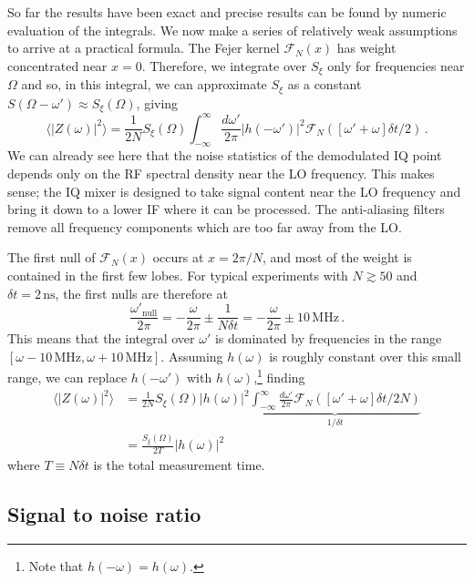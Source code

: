 So far the results have been exact and precise results can be found by numeric evaluation of the integrals.
We now make a series of relatively weak assumptions to arrive at a practical formula.
The Fejer kernel $\mathcal{F}_N(x)$ has weight concentrated near $x=0$.
Therefore, we integrate over $S_\xi$ only for frequencies near $\Omega$ and so, in this integral, we can approximate $S_\xi$ as a constant $S(\Omega - \omega') \approx S_\xi(\Omega)$, giving
\begin{equation}
\langle |Z(\omega)|^2 \rangle =
\frac{1}{2N} S_\xi(\Omega) \int_{-\infty}^\infty \frac{d\omega'}{2\pi} |h(-\omega')|^2 \mathcal{F}_N([\omega' + \omega]\delta t / 2) \, .
\end{equation}
We can already see here that the noise statistics of the demodulated IQ point depends only on the RF spectral density near the LO frequency.
This makes sense; the IQ mixer is designed to take signal content near the LO frequency and bring it down to a lower IF where it can be processed.
The anti-aliasing filters remove all frequency components which are too far away from the LO.

The first null of $\mathcal{F}_N(x)$ occurs at $x = 2\pi / N$, and most of the weight is contained in the first few lobes.
For typical experiments with $N \gtrsim 50$ and $\delta t = 2 \, \text{ns}$, the first nulls are therefore at
\begin{equation}
\frac{\omega'_{\text{null}}}{2\pi}
= - \frac{\omega}{2\pi} \pm \frac{1}{N \delta t}
= - \frac{\omega}{2\pi} \pm 10 \, \text{MHz} \, .
\end{equation}
This means that the integral over $\omega'$ is dominated by frequencies in the range $[\omega - 10\,\text{MHz}, \omega + 10 \, \text{MHz}]$.
Assuming $h(\omega)$ is roughly constant over this small range, we can replace $h(-\omega')$ with $h(\omega)$,\footnote{Note that $h(-\omega) = h(\omega)$.} finding
\begin{align}
\langle |Z(\omega)|^2 \rangle
&= \frac{1}{2N}S_\xi(\Omega)|h(\omega)|^2
\underbrace{
\int_{-\infty}^\infty \frac{d\omega'}{2\pi} \mathcal{F}_N([\omega' + \omega] \delta t / 2 N)
}_{1 / \delta t} \\
&= \frac{S_\xi(\Omega)}{2 T} |h(\omega)|^2
\end{align}
where $T \equiv N \delta t$ is the total measurement time.

\subsection{Signal to noise ratio}

